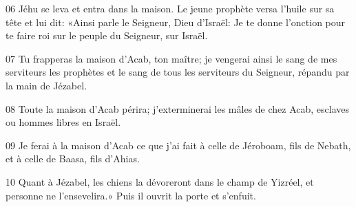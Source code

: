 
06 Jéhu se leva et entra dans la maison. Le jeune prophète versa l’huile sur sa tête et lui dit: «Ainsi parle le Seigneur, Dieu d’Israël: Je te donne l’onction pour te faire roi sur le peuple du Seigneur, sur Israël.

07 Tu frapperas la maison d’Acab, ton maître; je vengerai ainsi le sang de mes serviteurs les prophètes et le sang de tous les serviteurs du Seigneur, répandu par la main de Jézabel.

08 Toute la maison d’Acab périra; j’exterminerai les mâles de chez Acab, esclaves ou hommes libres en Israël.

09 Je ferai à la maison d’Acab ce que j’ai fait à celle de Jéroboam, fils de Nebath, et à celle de Baasa, fils d’Ahias.

10 Quant à Jézabel, les chiens la dévoreront dans le champ de Yizréel, et personne ne l’ensevelira.» Puis il ouvrit la porte et s’enfuit.

